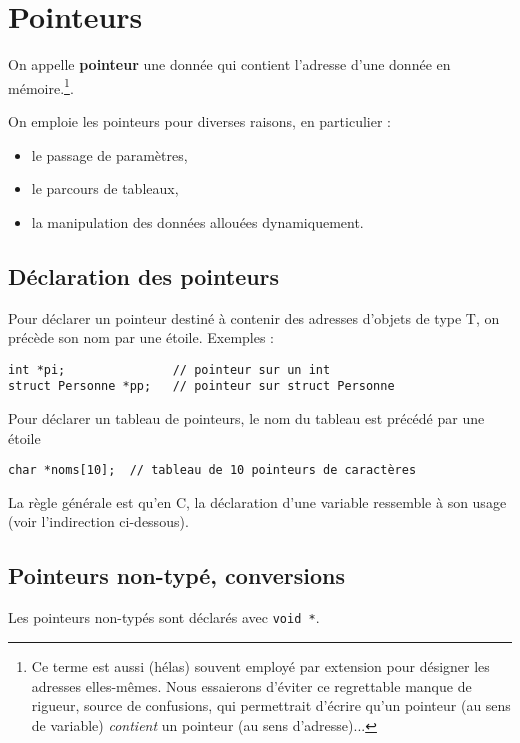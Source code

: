 \chapter{Pointeurs}

On appelle \textbf{pointeur} une donnée qui contient l'adresse d'une
donnée en mémoire.\footnote{Ce terme est aussi (hélas) souvent employé
  par extension pour désigner les adresses elles-mêmes. Nous
  essaierons d'éviter ce regrettable manque de rigueur, source de
  confusions, qui permettrait d'écrire qu'un pointeur (au sens de
  variable) \emph{contient} un pointeur (au sens d'adresse)...}.


On emploie les pointeurs pour diverses raisons, en particulier :

\begin{itemize}
\item le passage de paramètres,
\item le parcours de tableaux,
 \item la manipulation des données allouées dynamiquement.
\end{itemize}


\section{Déclaration des pointeurs}

Pour déclarer un pointeur destiné à contenir des adresses d'objets de type T,
on précède son nom par une étoile. Exemples :

\begin{lstlisting}[style=cextract]
int *pi;               // pointeur sur un int
struct Personne *pp;   // pointeur sur struct Personne
\end{lstlisting}

Pour déclarer un tableau de pointeurs, le nom du tableau est précédé par une
étoile

\begin{lstlisting}[style=cextract]
char *noms[10];  // tableau de 10 pointeurs de caractères
\end{lstlisting}

La règle générale est qu'en C, la déclaration d'une variable ressemble
à son usage (voir l'indirection ci-dessous).

\section{Pointeurs non-typé, conversions}

Les pointeurs non-typés sont déclarés avec \texttt{void *}.

